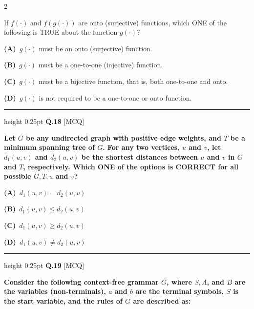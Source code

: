 \documentclass[a4paper,10pt,twoside]{article}
\begin{document}
\begin{multicols}{2}
{If $f(\cdot)$ and $f(g(\cdot))$ are onto (surjective) functions, which ONE of the following is TRUE about the function $g(\cdot)$? \par}
\par\vspace{2pt}\noindent
\textbf{(A)}~$g(\cdot)$ must be an onto (surjective) function.\par\vspace{2pt}\noindent
\textbf{(B)}~$g(\cdot)$ must be a one-to-one (injective) function.\par\vspace{2pt}\noindent
\textbf{(C)}~$g(\cdot)$ must be a bijective function, that is, both one-to-one and onto.\par\vspace{2pt}\noindent
\textbf{(D)}~$g(\cdot)$ is not required to be a one-to-one or onto function.
\par\vspace{6pt}\hrule height 0.25pt\vspace{6pt}
\noindent\textbf{Q.18} \hfill {\footnotesize\textsf{[MCQ]}}
\par\vspace{2pt}
{\bfseries Let $G$ be any undirected graph with positive edge weights, and $T$ be a minimum spanning tree of $G$. For any two vertices, $u$ and $v$, let $d_1(u, v)$ and $d_2(u, v)$ be the shortest distances between $u$ and $v$ in $G$ and $T$, respectively. Which ONE of the options is CORRECT for all possible $G, T, u$ and $v$? \par}
\par\vspace{2pt}\noindent
\textbf{(A)}~$d_1(u, v) = d_2(u, v)$\par\vspace{2pt}\noindent
\textbf{(B)}~$d_1(u, v) \le d_2(u, v)$\par\vspace{2pt}\noindent
\textbf{(C)}~$d_1(u, v) \ge d_2(u, v)$\par\vspace{2pt}\noindent
\textbf{(D)}~$d_1(u, v) \ne d_2(u, v)$
\par\vspace{6pt}\hrule height 0.25pt\vspace{6pt}
\noindent\textbf{Q.19} \hfill {\footnotesize\textsf{[MCQ]}}
\par\vspace{2pt}
{\bfseries Consider the following context-free grammar $G$, where $S, A$, and $B$ are the variables (non-terminals), $a$ and $b$ are the terminal symbols, $S$ is the start variable, and the rules of $G$ are described as:
}
\end{multicols}
\end{document}

